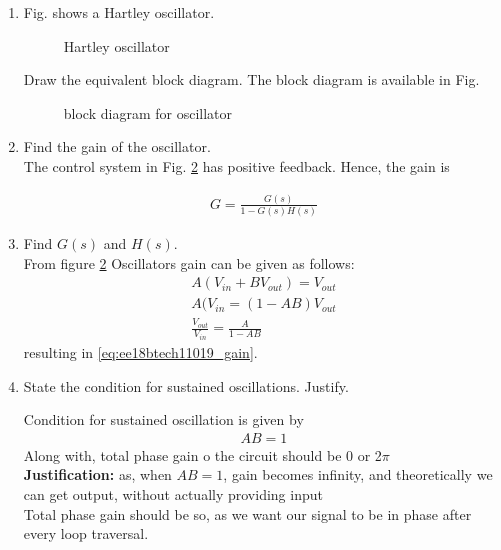 \begin{enumerate}[label=\thesection.\arabic*.,ref=\thesection.\theenumi]

\item Fig. \label{fig:ee18btech11019_hart} shows a Hartley oscillator.

\begin{figure}[ht]
    \begin{center}
	    \resizebox{\columnwidth}{!}{}
	\end{center}
\caption{Hartley oscillator}
\label{fig:ee18btech11019_hart}
\end{figure}
Draw the equivalent block diagram.
\solution  The block diagram is available in Fig. \label{fig:ee18btech11019_hart_block}
\begin{figure}[!ht]
    \begin{center}
		
		\resizebox{\columnwidth}{!}{} %
	\end{center}
\caption{block diagram for oscillator}
\label{fig:ee18btech11019_hart_block}
\end{figure}
%
\item Find the gain of the oscillator. 
\\
\solution The control system in Fig. \ref{fig:ee18btech11019_hart_block} has positive feedback.  Hence, the gain is 

\begin{align}
    G = \frac{G(s)}{1-G(s)H(s)}
\label{eq:ee18btech11019_gain}
\end{align}
%
\item Find $G(s)$ and $H(s)$.
\\
\solution From figure \ref{fig:ee18btech11019_hart_block}
Oscillators gain can be given as follows:\\
\begin{align}
    A(V_{in} + BV_{out}) =V_{out}\\
    A(V_{in} = (1-AB)V_{out}\\
    \frac{V_{out}}{V_{in}} = \frac{A}{1 - AB}
\end{align}
%
resulting in \eqref{eq:ee18btech11019_gain}.\\



\item State the condition for sustained oscillations. Justify.

\solution Condition for sustained oscillation is given by\\
\begin{align}
    AB = 1
\end{align}
Along with, total phase gain o the circuit should be 0 or 2$\pi$\\
\textbf{Justification:} as, when $ AB =1 $, gain becomes infinity, and theoretically we can get output, without actually providing input\\
Total phase gain should be so, as we want our signal to be in phase after every loop traversal.\\



\end{enumerate}
